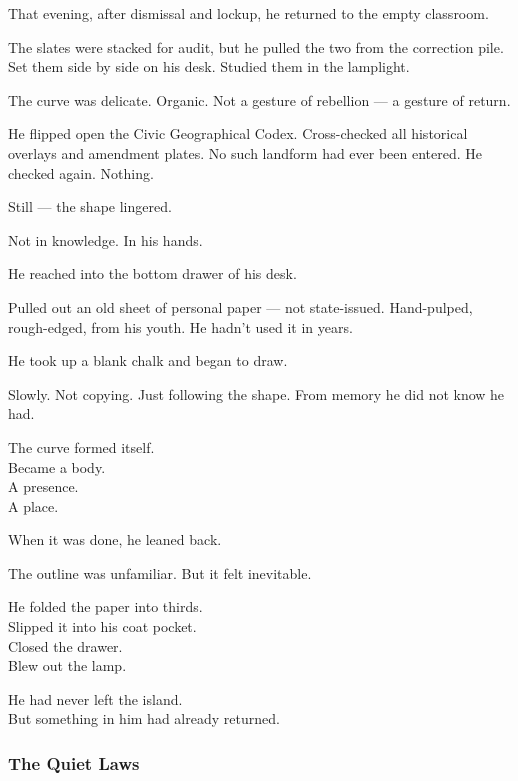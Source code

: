 \documentclass[12pt]{article}
\begin{document}
\vspace{1em}

That evening, after dismissal and lockup, he returned to the empty classroom.

The slates were stacked for audit, but he pulled the two from the correction pile. Set them side by side on his desk. Studied them in the lamplight.

The curve was delicate. Organic. Not a gesture of rebellion --- a gesture of return.

He flipped open the Civic Geographical Codex. Cross-checked all historical overlays and amendment plates. No such landform had ever been entered. He checked again. Nothing.

Still --- the shape lingered.

Not in knowledge. In his hands.

\vspace{1em}

He reached into the bottom drawer of his desk.

Pulled out an old sheet of personal paper --- not state-issued. Hand-pulped, rough-edged, from his youth. He hadn’t used it in years.

He took up a blank chalk and began to draw.

Slowly. Not copying. Just following the shape. From memory he did not know he had.

The curve formed itself.\\
Became a body.\\
A presence.\\
A place.

When it was done, he leaned back.

The outline was unfamiliar. But it felt inevitable.

\vspace{1em}

He folded the paper into thirds.\\
Slipped it into his coat pocket.\\
Closed the drawer.\\
Blew out the lamp.

\vspace{1em}

He had never left the island.\\
But something in him had already returned.

\dotfill

\subsubsection{The Quiet Laws}
\end{document}
